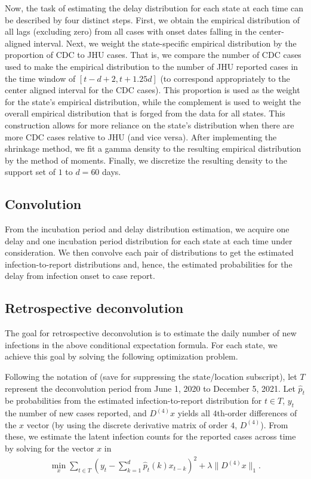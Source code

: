 \documentclass{article}
\begin{document}
Now, the task of estimating the delay distribution for each state at each time
can be described by four distinct steps. First, we obtain the empirical
distribution of all lags (excluding zero) from all cases with onset dates
falling in the center-aligned interval. Next, we weight the state-specific
empirical distribution by the proportion of CDC to JHU cases. That is, we
compare the number of CDC cases used to make the empirical distribution to the
number of JHU reported cases in the time window of $\left[t - d + 2, t +
1.25d\right]$ (to correspond appropriately to the center aligned interval for
the CDC cases). This proportion is used as the weight for the state’s empirical
distribution, while the complement is used to weight the overall empirical
distribution that is forged from the data for all states. This construction
allows for more reliance on the state's distribution when there are more CDC
cases relative to JHU (and vice versa). After implementing the shrinkage method,
we fit a gamma density to the resulting empirical distribution by the method of
moments. Finally, we discretize the resulting density to the support set of $1$
to $d = 60$ days.
 
\subsection{Convolution} 

From the incubation period and delay distribution estimation, we acquire one
delay and one incubation period distribution for each state at each time under
consideration. We then convolve each pair of distributions to get the estimated
infection-to-report distributions and, hence, the estimated probabilities for
the delay from infection onset to case report. 

\subsection{Retrospective deconvolution}

The goal for retrospective deconvolution is to estimate the daily number of new
infections in the above conditional expectation formula. For each state, we
achieve this goal by solving the following optimization problem. 

Following the notation of \citet{jahja2022real} (save for suppressing the
state/location subscript), let $T$ represent the deconvolution period from June
1, 2020 to December 5, 2021. Let $\hat{p}_t$ be probabilities from the estimated
infection-to-report distribution for $t \in T$, $y_t$ the number of new cases
reported, and $D^{(4)}x$ yields all $4$th-order differences of the $x$ vector
(by using the discrete derivative matrix of order $4$, $D^{(4)}$). From these,
we estimate the latent infection counts for the reported cases across time by
solving for the vector $x$ in
\begin{align*}
\min_{x} \sum_{t \in T} \left ( y_t -  \sum_{k = 1}^{d} \hat{p}_t(k)x_{t-k} 
\right )^2 + \lambda \|D^{(4)}x\|_1. 
\end{align*}
\end{document}
